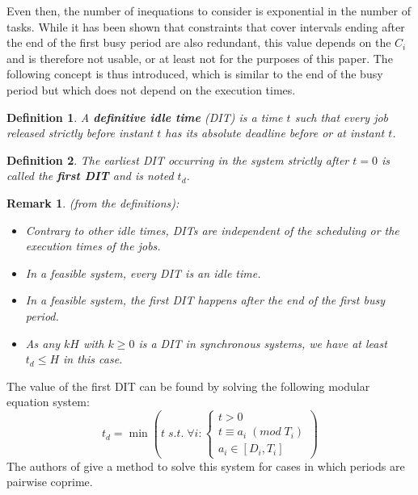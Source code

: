 \documentclass[times, 10pt,twocolumn, a4paper]{article}
\newtheorem{definition}{Definition}
\newtheorem{remark}{Remark}
\begin{document}
	Even then, the number of inequations to consider is exponential in the number
	of tasks. While it has been shown that constraints that cover intervals ending
	after the end of the first busy period are also redundant, this value depends on the $C_i$ and is
	therefore not usable, or at least not for the purposes of this paper. The
	following concept is thus introduced, which is similar to the end of the busy period but which does not depend on the execution times.

	\begin{definition}
		A \textbf{definitive idle time} (DIT) is a time $t$ such that every job
		released strictly before instant $t$ has its absolute deadline before or at instant $t$.
	\end{definition}

	\begin{definition}
		The earliest DIT occurring in the system strictly after $t=0$ is called the
		\textbf{first DIT} and is noted $t_d$.
	\end{definition}

	\begin{remark} (from the definitions):
		\begin{itemize}
			\item Contrary to other idle times, DITs are independent of the
			scheduling or the execution times of the jobs.
			\item In a feasible system, every DIT is an idle time.
			\item In a feasible system, the first DIT happens after the end of the
			first busy period.
			\item As any $kH$ with $k \geqslant 0$ is a DIT in synchronous systems, we have at least $t_d
			\leqslant H$ in this case.
		\end{itemize}
	\end{remark}

	The value of the first DIT can be found by solving the following modular equation system:
	\[
		t_d = \min
		\left( t \; s.t. \; \forall i:
			\left\{
				\begin{array}{c}
					t > 0 \\
					t \equiv a_i \; (mod \; T_i) \\
					a_i \in [D_i, T_i]
				\end{array}
			\right.
		\right)
	\]
	The authors of \cite{george2009characterization} give a method to solve this system for cases in which periods are pairwise coprime.\\
\end{document}
